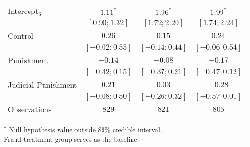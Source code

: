 \begin{table}[h]
\begin{center}
\begin{threeparttable}
\begin{tabular}{l c c c}
Intercept$_3$       & $1.11^{*}$        & $1.96^{*}$        & $1.99^{*}$        \\
                    & $ [ 0.90;  1.32]$ & $ [ 1.72;  2.20]$ & $ [ 1.74;  2.24]$ \\
Control             & $0.26$            & $0.15$            & $0.24$            \\
                    & $ [-0.02;  0.55]$ & $ [-0.14;  0.44]$ & $ [-0.06;  0.54]$ \\
Punishment          & $-0.14$           & $-0.08$           & $-0.17$           \\
                    & $ [-0.42;  0.15]$ & $ [-0.37;  0.21]$ & $ [-0.47;  0.12]$ \\
Judicial Punishment & $0.21$            & $0.03$            & $-0.28$           \\
                    & $ [-0.08;  0.50]$ & $ [-0.26;  0.32]$ & $ [-0.57;  0.01]$ \\
\hline
Observations        & $829$             & $821$             & $806$             \\
\hline
\end{tabular}
\begin{tablenotes}[flushleft]
\scriptsize{$^*$ Null hypothesis value outside 89\% credible interval.  \\
Fraud treatment group serves as the baseline.}
\end{tablenotes}
\end{threeparttable}
\label{table:coefficients}
\end{center}
\end{table}
